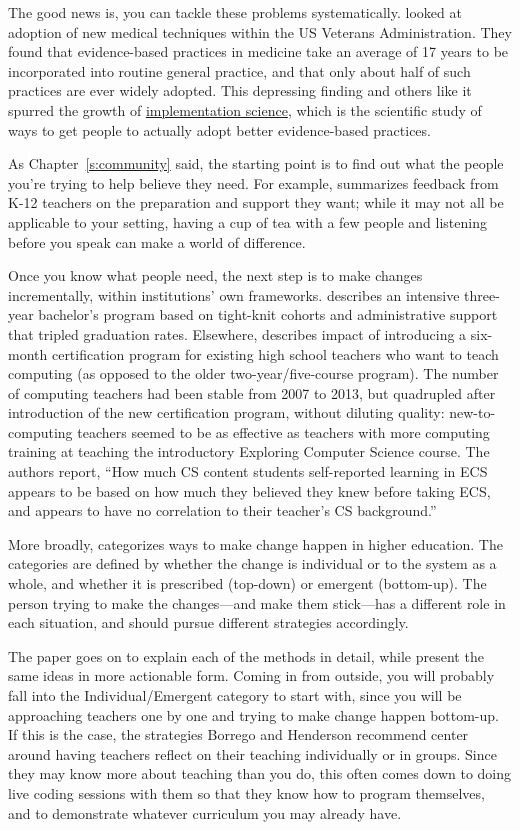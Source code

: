 The good news is, you can tackle these problems systematically.
\cite{Baue2015} looked at adoption of new medical
techniques within the US Veterans Administration. They found that
evidence-based practices in medicine take an average of 17 years to be
incorporated into routine general practice, and that only about half
of such practices are ever widely adopted. This depressing finding and
others like it spurred the growth of \protect\hyperlink{g:implementation-science}{implementation
science}, which is the
scientific study of ways to get people to actually adopt better
evidence-based practices.

As Chapter~\ref{s:community} said, the starting point is to find out what
the people you're trying to help believe they need. For example,
\cite{Yada2016} summarizes feedback from K-12 teachers on the
preparation and support they want; while it may not all be applicable to
your setting, having a cup of tea with a few people and listening before
you speak can make a world of difference.

Once you know what people need, the next step is to make changes
incrementally, within institutions' own frameworks. \cite{Nara2018}
describes an intensive three-year bachelor's program based on tight-knit
cohorts and administrative support that tripled graduation rates.
Elsewhere, \cite{Hu2017} describes impact of introducing a six-month
certification program for existing high school teachers who want to
teach computing (as opposed to the older two-year/five-course program).
The number of computing teachers had been stable from 2007 to 2013, but
quadrupled after introduction of the new certification program, without
diluting quality: new-to-computing teachers seemed to be as effective as
teachers with more computing training at teaching the introductory
Exploring Computer Science course. The authors report, ``How much CS
content students self-reported learning in ECS appears to be based on
how much they believed they knew before taking ECS, and appears to have
no correlation to their teacher's CS background.''

More broadly, \cite{Borr2014} categorizes ways to make change happen
in higher education. The categories are defined by whether the change is
individual or to the system as a whole, and whether it is prescribed
(top-down) or emergent (bottom-up). The person trying to make the
changes---and make them stick---has a different role in each situation, and
should pursue different strategies accordingly.

The paper goes on to explain each of the methods in detail, while
\cite{Hend2015a,Hend2015b} present the same ideas in more actionable
form. Coming in from outside, you will probably fall into the
Individual/Emergent category to start with, since you will be
approaching teachers one by one and trying to make change happen
bottom-up. If this is the case, the strategies Borrego and Henderson
recommend center around having teachers reflect on their teaching
individually or in groups. Since they may know more about teaching than
you do, this often comes down to doing live coding sessions with them so
that they know how to program themselves, and to demonstrate whatever
curriculum you may already have.

